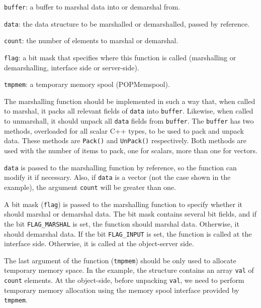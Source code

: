 \begin{petitem}

	\item \texttt{buffer}: a buffer to marshal data into or
		demarshal from.

	\item \texttt{data}: the data structure to be marshalled or
		demarshalled, passed by reference.

	\item \texttt{count}: the number of elements to marshal or
		demarshal.

	\item \texttt{flag}: a bit mask that specifies where this
		function is called (marshalling or demarshalling, interface side or server-side). 

	\item \texttt{tmpmem}: a temporary memory spool (POPMemspool). 

\end{petitem}


The marshalling function should be implemented in such a way that, when
called to marshal, it packs all relevant fields of \texttt{data} into
\texttt{buffer}. Likewise, when called to unmarshall, it should unpack
all \texttt{data} fields from \texttt{buffer}. The \texttt{buffer} has
two methods, overloaded for all scalar C++ types, to be used to pack and
unpack data. These methods are \texttt{Pack()} and \texttt{UnPack()}
respectively. Both methods are used with the number of items to pack,
one for scalars, more than one for vectors.


\texttt{data} is passed to the marshalling function by reference, so the
function can modify it if necessary. Also, if \texttt{data} is a vector
(not the case shown in the example), the argument \texttt{count} will be
greater than one.

A bit mask (\texttt{flag}) is passed to the marshalling function to
specify whether it should marshal or demarshal data. The bit mask
contains several bit fields, and if the bit \texttt{FLAG\_MARSHAL} is
set, the function should marshal data. Otherwise, it
should demarshal data. If the bit \texttt{FLAG\_INPUT} is set,
the function is called at the interface side. Otherwise,
it is called at the object-server side.

The last argument of the function (\texttt{tmpmem}) should be only used to 
allocate temporary memory space. In the example, the 
structure contains an array \texttt{val} of \texttt{count} elements. At the
object-side, before unpacking \texttt{val}, we need to perform temporary
memory allocation using the memory spool interface provided by \texttt{tmpmem}.  
 
